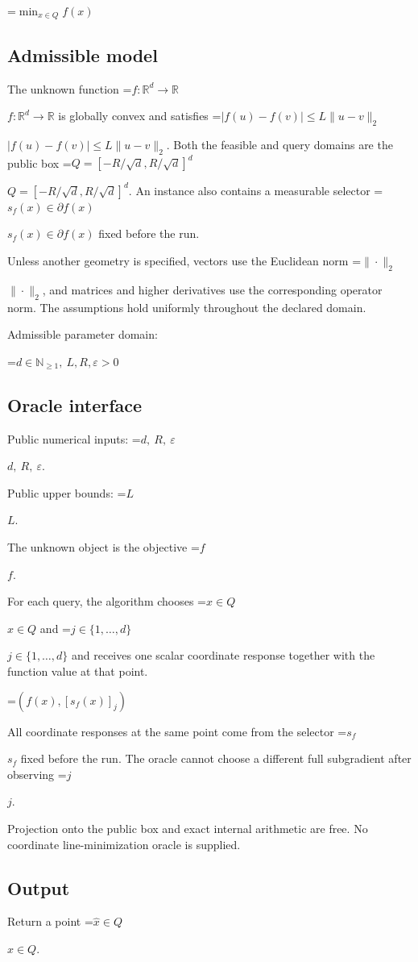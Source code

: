 \documentclass[10pt,a4paper]{article}
\newcommand{\AtlasMath}[1]{\par\begingroup\centering\setbox0=\hbox{$\displaystyle #1$}\ifdim\wd0>1.4\linewidth\typeout{ATLAS WIDE FORMULA: \the\wd0}\fi\ifdim\wd0>\linewidth\resizebox{\linewidth}{!}{\box0}\else\box0\fi\par\endgroup}
\newcommand{\AtlasInlineMath}[1]{\begingroup\setbox0=\hbox{$#1$}\ifdim\wd0>.4\linewidth\endgroup\AtlasMath{#1}\else\endgroup$#1$\fi}
\begin{document}
\AtlasMath{\min_{x\in Q}f(x)}


\subsection{Admissible model}
The unknown function \AtlasInlineMath{f:\mathbb R^d\to\mathbb R} is globally convex and satisfies \AtlasInlineMath{|f(u)-f(v)|\le L\|u-v\|_2}. Both the feasible and query domains are the public box \AtlasInlineMath{Q=[-R/\sqrt d,R/\sqrt d]^d}. An instance also contains a measurable selector \AtlasInlineMath{s_f(x)\in\partial f(x)} fixed before the run.

Unless another geometry is specified, vectors use the Euclidean norm \AtlasInlineMath{\|\cdot\|_2}, and matrices and higher derivatives use the corresponding operator norm. The assumptions hold uniformly throughout the declared domain.

Admissible parameter domain:


\AtlasMath{d\in\mathbb{N}_{\ge1},\ L,R,\varepsilon>0}


\subsection{Oracle interface}
Public numerical inputs: \AtlasInlineMath{d,\ R,\ \varepsilon}.

Public upper bounds: \AtlasInlineMath{L}.

The unknown object is the objective \AtlasInlineMath{f}.

For each query, the algorithm chooses \AtlasInlineMath{x\in Q} and \AtlasInlineMath{j\in\{1,\ldots,d\}} and receives one scalar coordinate response together with the function value at that point.


\AtlasMath{(f(x),[s_f(x)]_j)}


All coordinate responses at the same point come from the selector \AtlasInlineMath{s_f} fixed before the run. The oracle cannot choose a different full subgradient after observing \AtlasInlineMath{j}.

Projection onto the public box and exact internal arithmetic are free. No coordinate line-minimization oracle is supplied.

\subsection{Output}
Return a point \AtlasInlineMath{\widehat x\in Q}.
\end{document}

